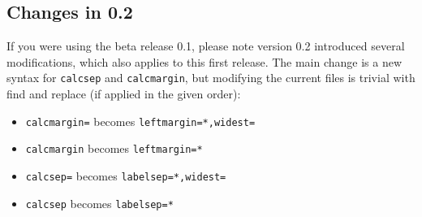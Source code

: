 \documentclass{article}
\begin{document}
\subsection{Changes in 0.2}

If you were using the beta release 0.1, please note version 0.2
introduced several modifications, which also applies to this
first release.  The main change is a new syntax for
\verb|calcsep| and \verb|calcmargin|, but modifying the current files
is trivial with find and replace (if applied in the given order):
\begin{itemize}
\item
\verb|calcmargin=| becomes \verb|leftmargin=*,widest=|
\item
\verb|calcmargin| becomes \verb|leftmargin=*|
\item
\verb|calcsep=| becomes \verb|labelsep=*,widest=|
\item
\verb|calcsep| becomes \verb|labelsep=*|
\end{itemize}
\end{document}
